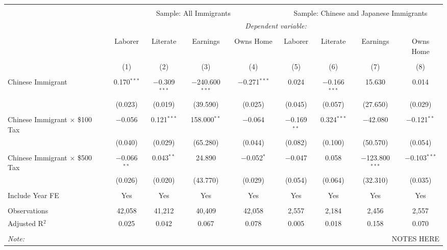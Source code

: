 
\begin{tabular}{@{\extracolsep{5pt}}lcccccccc} 
\\[-1.8ex]\hline 
\hline \\[-1.8ex] 
 & \multicolumn{4}{c}{Sample: All Immigrants} & \multicolumn{4}{c}{Sample: Chinese and Japanese Immigrants} \\ 
 & \multicolumn{8}{c}{\textit{Dependent variable:}} \\ 
\cline{2-9} 
\\[-1.8ex] & Laborer & Literate & Earnings & Owns Home \,\, & Laborer & Literate & Earnings & Owns Home \\ 
\\[-1.8ex] & (1) & (2) & (3) & (4) & (5) & (6) & (7) & (8)\\ 
\hline \\[-1.8ex] 
 Chinese Immigrant & 0.170$^{***}$ & $-$0.309$^{***}$ & $-$240.600$^{***}$ & $-$0.271$^{***}$ & 0.024 & $-$0.166$^{***}$ & 15.630 & 0.014 \\ 
  & (0.023) & (0.019) & (39.590) & (0.025) & (0.045) & (0.057) & (27.650) & (0.029) \\ 
  & & & & & & & & \\ 
 Chinese Immigrant $\times$ \$100 Tax & $-$0.056 & 0.121$^{***}$ & 158.000$^{**}$ & $-$0.064 & $-$0.169$^{**}$ & 0.324$^{***}$ & $-$42.080 & $-$0.121$^{**}$ \\ 
  & (0.040) & (0.029) & (65.280) & (0.044) & (0.082) & (0.100) & (50.570) & (0.054) \\ 
  & & & & & & & & \\ 
 Chinese Immigrant $\times$ \$500 Tax & $-$0.066$^{**}$ & 0.043$^{**}$ & 24.890 & $-$0.052$^{*}$ & $-$0.047 & 0.058 & $-$123.800$^{***}$ & $-$0.103$^{***}$ \\ 
  & (0.026) & (0.020) & (43.770) & (0.029) & (0.054) & (0.064) & (32.310) & (0.035) \\ 
  & & & & & & & & \\ 
Include Year FE & Yes & Yes & Yes & Yes & Yes & Yes & Yes & Yes \\ 
\hline \\[-1.8ex] 
Observations & 42,058 & 41,212 & 40,409 & 42,058 & 2,557 & 2,184 & 2,456 & 2,557 \\ 
Adjusted R$^{2}$ & 0.025 & 0.042 & 0.067 & 0.078 & 0.005 & 0.018 & 0.158 & 0.070 \\ 
\hline \\[-1.8ex] 
\textit{Note:}  & \multicolumn{8}{r}{NOTES HERE} \\ 
\end{tabular} 
